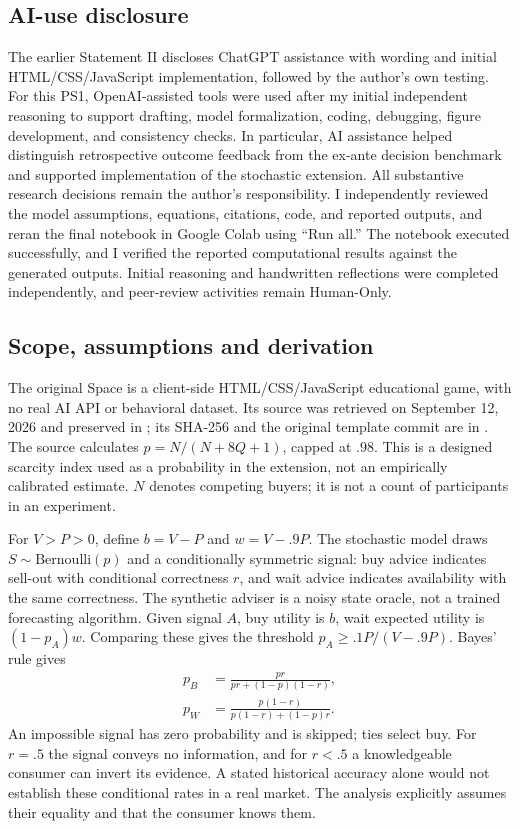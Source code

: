 \subsection{AI-use disclosure}
The earlier Statement II discloses ChatGPT assistance with wording and initial HTML/CSS/JavaScript implementation, followed by the author's own testing. For this PS1, OpenAI-assisted tools were used after my initial independent reasoning to support drafting, model formalization, coding, debugging, figure development, and consistency checks. In particular, AI assistance helped distinguish retrospective outcome feedback from the ex-ante decision benchmark and supported implementation of the stochastic extension. All substantive research decisions remain the author's responsibility. I independently reviewed the model assumptions, equations, citations, code, and reported outputs, and reran the final notebook in Google Colab using ``Run all.'' The notebook executed successfully, and I verified the reported computational results against the generated outputs. Initial reasoning and handwritten reflections were completed independently, and peer-review activities remain Human-Only.

\subsection{Scope, assumptions and derivation}
The original Space is a client-side HTML/CSS/JavaScript educational game, with no real AI API or behavioral dataset. Its source was retrieved on September 12, 2026 and preserved in ; its SHA-256 and the original template commit are in . The source calculates $p=N/(N+8Q+1)$, capped at $.98$. This is a designed scarcity index used as a probability in the extension, not an empirically calibrated estimate. $N$ denotes competing buyers; it is not a count of participants in an experiment.

For $V>P>0$, define $b=V-P$ and $w=V-.9P$. The stochastic model draws $S\sim\mathrm{Bernoulli}(p)$ and a conditionally symmetric signal: buy advice indicates sell-out with conditional correctness $r$, and wait advice indicates availability with the same correctness. The synthetic adviser is a noisy state oracle, not a trained forecasting algorithm. Given signal $A$, buy utility is $b$, wait expected utility is $(1-p_A)w$. Comparing these gives the threshold $p_A\geq .1P/(V-.9P)$. Bayes' rule gives
\[
 \begin{aligned}p_B&=\frac{pr}{pr+(1-p)(1-r)},\\
 p_W&=\frac{p(1-r)}{p(1-r)+(1-p)r}.\end{aligned}
\]
An impossible signal has zero probability and is skipped; ties select buy. For $r=.5$ the signal conveys no information, and for $r<.5$ a knowledgeable consumer can invert its evidence. A stated historical accuracy alone would not establish these conditional rates in a real market. The analysis explicitly assumes their equality and that the consumer knows them.

